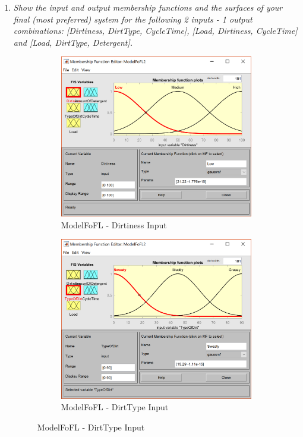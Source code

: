 \documentclass[11pt]{article}
\begin{document}
\begin{enumerate}[label=(\alph*)]

  \item \textit{Show the input and output membership functions and the surfaces
  of your ﬁnal (most preferred) system for the following 2 inputs - 1 output
  combinations: [Dirtiness, DirtType, CycleTime], [Load, Dirtiness, CycleTime]
  and [Load, DirtType, Detergent].}

  \begin{figure}[ht!]
  \centering
  \begin{subfigure}{.5\textwidth}
    \centering
    \includegraphics[width=.9\linewidth]{res/image3_dirtiness}
    \caption{ModelFoFL - Dirtiness Input}
    \label{fig:sub1}
  \end{subfigure}%
  \begin{subfigure}{.5\textwidth}
    \centering
    \includegraphics[width=.9\linewidth]{res/image3_dirttype}
    \caption{ModelFoFL - DirtType Input}
    \label{fig:sub2}
  \end{subfigure}
  \end{figure}


\end{enumerate}
\end{document}
